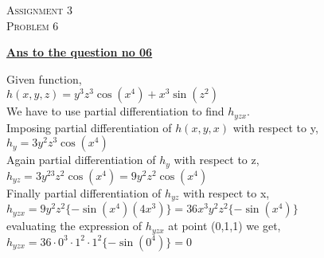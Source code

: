 \documentclass{article}
\begin{document}
\begin{newpage}
    \begin{flushright}
    \textsc{Assignment 3}\\
    \textsc{Problem 6}\\
    [1 cm]
    \end{flushright}
\begin{center}
  \textbf{\Large \underline {Ans to the question no 06}}\\
  [1 cm]
\end{center}
\Large {Given function, \\[3mm]
$h(x,y,z) = y^3z^3 \cos(x^4)+x^3 \sin(z^2)$\\[3mm]
We have to use partial differentiation to find $ h_{yzx}$.\\[3mm]
Imposing partial differentiation of $h(x,y,x)$ with respect to y,\\[3mm]
$h_{y}=3y^2z^3 \cos(x^4)$\\[3mm]
Again partial differentiation of $h_{y}$ with respect to z, \\[3mm]
$h_{yz}=3y^23z^2 \cos(x^4)=9y^2z^2\cos(x^4)$\\[3mm]
Finally partial differentiation of $h_{yz}$ with respect to x, \\[3mm] 
$h_{yzx}=9y^2z^2\{-\sin(x^4)(4x^3)\}=36x^3y^2z^2\{-\sin(x^4)\}$\\[3mm] 
evaluating the expression of $h_{yzx}$ at point (0,1,1) we get,\\[3mm] 
$h_{yzx}=36\cdot0^3\cdot1^2\cdot1^2\{-\sin(0^4)\}=0$\\[3mm]}
\end{newpage}
\end{document}
